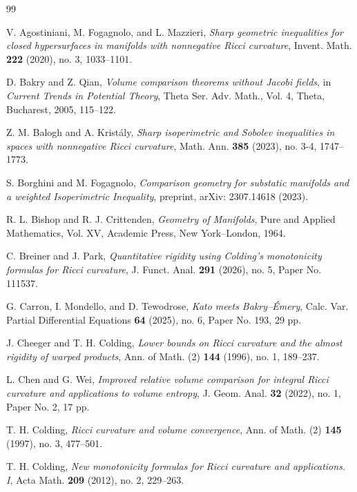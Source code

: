 \documentclass[11pt]{article}
\begin{document}
\begin{thebibliography}{99}

 V. Agostiniani, M. Fogagnolo, and L. Mazzieri, {\em Sharp geometric inequalities for closed hypersurfaces in manifolds with nonnegative Ricci curvature}, Invent. Math. {\bf 222} (2020), no. 3, 1033--1101.

 D. Bakry and Z. Qian, {\em Volume comparison theorems without Jacobi fields}, in {\em Current Trends in Potential Theory}, Theta Ser. Adv. Math., Vol. 4, Theta, Bucharest, 2005, 115--122.

 Z. M. Balogh and A. Krist\'aly, {\em Sharp isoperimetric and Sobolev inequalities in spaces with nonnegative Ricci curvature}, Math. Ann. {\bf 385} (2023), no. 3-4, 1747--1773.

 S. Borghini and M. Fogagnolo, {\em Comparison geometry for substatic manifolds and a weighted Isoperimetric Inequality}, preprint, arXiv: 2307.14618 (2023).

 R. L. Bishop and R. J. Crittenden, {\em Geometry of Manifolds}, Pure and Applied Mathematics, Vol. XV, Academic Press, New York--London, 1964.

 C. Breiner and J. Park, {\em Quantitative rigidity using Colding's monotonicity formulas for Ricci curvature}, J. Funct. Anal. {\bf 291} (2026), no. 5, Paper No. 111537.

 G. Carron, I. Mondello, and D. Tewodrose, {\em Kato meets Bakry--\'Emery}, Calc. Var. Partial Differential Equations {\bf 64} (2025), no. 6, Paper No. 193, 29 pp.

 J. Cheeger and T. H. Colding, {\em Lower bounds on Ricci curvature and the almost rigidity of warped products}, Ann. of Math. (2) {\bf 144} (1996), no. 1, 189--237.

 L. Chen and G. Wei, {\em Improved relative volume comparison for integral Ricci curvature and applications to volume entropy}, J. Geom. Anal. {\bf 32} (2022), no. 1, Paper No. 2, 17 pp.

 T. H. Colding, {\em Ricci curvature and volume convergence}, Ann. of Math. (2) {\bf 145} (1997), no. 3, 477--501.

 T. H. Colding, {\em New monotonicity formulas for Ricci curvature and applications. I}, Acta Math. {\bf 209} (2012), no. 2, 229--263.


\end{thebibliography}
\end{document}
